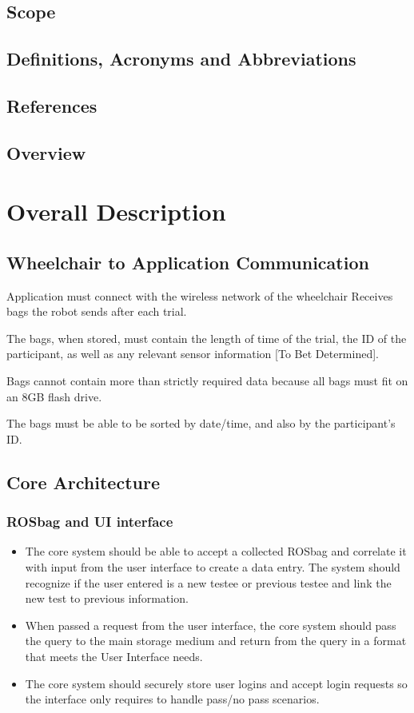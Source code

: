 \documentclass[onecolumn, draftclsnofoot,10pt, compsoc]{IEEEtran}
\begin{document}
\subsection{Scope}
\subsection{Definitions, Acronyms and Abbreviations}
\subsection{References}
\subsection{Overview}
\section{Overall Description}
\subsection{Wheelchair to Application Communication}
	\item Application must connect with the wireless network of the wheelchair 
	\subitem Receives bags the robot sends after each trial.
	\item The bags, when stored, must contain the length of time of the trial, the ID of the participant, as well as any relevant sensor information [To Bet Determined].
	\item Bags cannot contain more than strictly required data because all bags must fit on an 8GB flash drive.
	\item The bags must be able to be sorted by date/time, and also by the participant's ID.
\subsection{Core Architecture}
\subsubsection{ROSbag and UI interface}
\begin{itemize}
	\item The core system should be able to accept a collected ROSbag and correlate it with input from the user interface to create a data entry.
	\subitem The system should recognize if the user entered is a new testee or previous testee and link the new test to previous information.
	\item When passed a request from the user interface, the core system should pass the query to the main storage medium and return from the query in a format that meets the User Interface needs.
	\item The core system should securely store user logins and accept login requests so the interface only requires to handle pass/no pass scenarios.
\end{itemize}
\end{document}
